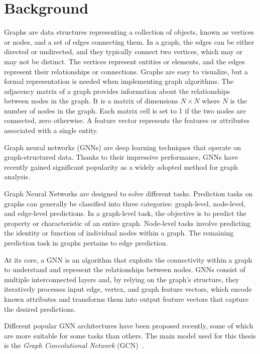 \documentclass[11pt,a4paper,twocolumn]{article}
\begin{document}
\section{Background}
\label{sec:background}%

Graphs are data structures representing a collection of objects, known as vertices or nodes, and a set of edges connecting them.
In a graph, the edges can be either directed or undirected, and they typically connect two vertices, which may or may not be distinct.
The vertices represent entities or elements, and the edges represent their relationships or connections.
Graphs are easy to visualize, but a formal representation is needed when implementing graph algorithms.
The adjacency matrix of a graph provides information about the relationships between nodes in the graph.
It is a matrix of dimensions $N \times N$ where $N$ is the number of nodes in the graph. Each matrix cell is set to 1 if the two nodes are connected, zero otherwise.
A feature vector represents the features or attributes associated with a single entity.

Graph neural networks (GNNs) are deep learning techniques that operate on graph-structured data.
Thanks to their impressive performance, GNNs have recently gained significant popularity as a widely adopted method for graph analysis.

Graph Neural Networks are designed to solve different tasks.
Prediction tasks on graphs can generally be classified into three categories: graph-level, node-level, and edge-level predictions.
In a graph-level task, the objective is to predict the property or characteristic of an entire graph.
Node-level tasks involve predicting the identity or function of individual nodes within a graph.
The remaining prediction task in graphs pertains to edge prediction.

At its core, a GNN is an algorithm that exploits the connectivity within a graph to understand and represent the relationships between nodes.
GNNs consist of multiple interconnected layers and, by relying on the graph's structure, they iteratively processes input edge, vertex, and graph feature vectors, which encode known attributes and transforms them into output feature vectors that capture the desired predictions.

Different popular GNN architectures have been proposed recently, some of which are more suitable for some tasks than others.
The main model used for this thesis is the \textit{Graph Convolutional Network} (GCN)~\cite{DBLP:journals/corr/KipfW16}.
\end{document}
